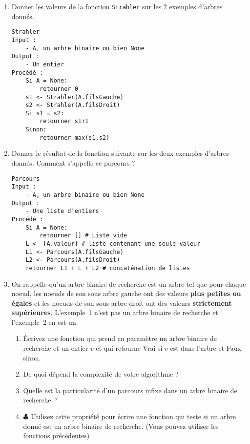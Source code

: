 \begin{exercice}
\begin{enumerate}
\item Donner les valeurs de la fonction {\tt Strahler} sur les 2 exemples d'arbres donnés.
\begin{lstlisting}
Strahler
Input :
    - A, un arbre binaire ou bien None
Output :
    - Un entier
Procédé :
	Si A = None:
	    retourner 0
	s1 <- Strahler(A.filsGauche)
	s2 <- Strahler(A.filsDroit)
	Si s1 = s2:
	    retourner s1+1
	Sinon:
	    retourner max(s1,s2)
\end{lstlisting}


\item Donner le résultat de la fonction suivante sur les deux exemples d'arbres donnés. Comment s'appelle ce parcours ?

\begin{lstlisting}
Parcours
Input :
    - A, un arbre binaire ou bien None
Output :
    - Une liste d'entiers
Procédé :
	Si A = None:
	    retourner [] # Liste vide
	L <- [A.valeur] # liste contenant une seule valeur
	L1 <- Parcours(A.filsGauche)
	L2 <- Parcours(A.filsDroit)
	retourner L1 + L + L2 # concaténation de listes
\end{lstlisting}

\item On rappelle qu'un arbre binaire de recherche est un arbre tel que pour chaque noeud, les noeuds de son sous arbre gauche ont des valeurs \textbf{plus petites ou égales} et les noeuds de son sous arbre droit ont des valeurs \textbf{strictement supérieures}. L'exemple~1 n'est pas un arbre  binaire de recherche et l'exemple~2 en est un. 
\begin{enumerate}
\item \'Ecrivez une fonction qui prend en paramètre un arbre binaire de recherche et un entier $v$ et qui retourne Vrai si $v$ est dans l'arbre et Faux sinon.
\item De quoi dépend la complexité de votre algorithme ?
\item Quelle est la particularité d'un parcours infixe dans un arbre binaire de recherche~?
\item $\clubsuit$ Utilisez cette propriété pour écrire une fonction qui teste si un arbre donné est un arbre binaire de recherche. (Vous pouvez utiliser les fonctions précédentes)
\end{enumerate}

\end{enumerate}

\end{exercice}